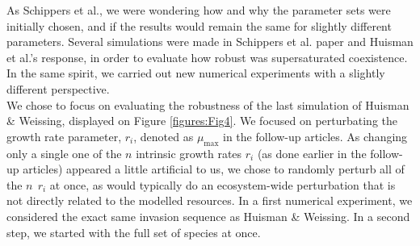As Schippers et al.\supercite{2008:Schippers}, we were wondering how and why the parameter sets were initially chosen, 
and if the results would remain the same for slightly different parameters. Several simulations were made in 
Schippers et al. paper\supercite{2008:Schippers} and Huisman et al.'s response\supercite{2008:Huisman}, in order to evaluate how robust was supersaturated 
coexistence. In the same spirit, we carried out new numerical experiments with a slightly different perspective.\\

We chose to focus on evaluating the robustness of the last simulation of Huisman \& Weissing\supercite{1999:Huisman}, displayed on Figure \ref{figures:Fig4}. We focused on perturbating the growth rate parameter, $r_i$, denoted as $\mu_{\text{max}}$ in the follow-up articles\supercite{2008:Schippers,2008:Huisman}. 
As changing only a single one of the $n$ intrinsic growth rates $r_i$ (as done earlier in the follow-up articles\supercite{2008:Schippers,2008:Huisman}) appeared a little artificial to us, 
we chose to randomly perturb all of the $n~~r_i$ at once, as would typically do an ecosystem-wide perturbation that is not directly related to the modelled resources. 
In a first numerical experiment, we considered the exact same invasion sequence as Huisman \& Weissing\supercite{1999:Huisman}. 
In a second step, we started with the full set of species at once. 

